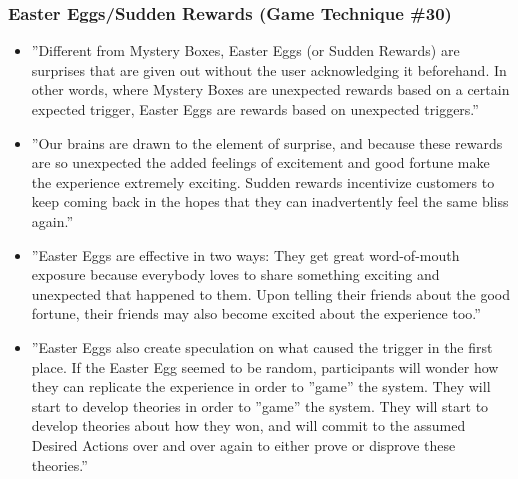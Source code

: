     \subsubsection{Easter Eggs/Sudden Rewards (Game Technique \#30)}
        \begin{itemize}
            \item ''Different from Mystery Boxes, Easter Eggs (or Sudden Rewards) are surprises that are given out without the user acknowledging it beforehand. In other words, where Mystery Boxes are unexpected rewards based on a certain expected trigger, Easter Eggs are rewards based on unexpected triggers.''
            \item ''Our brains are drawn to the element of surprise, and because these rewards are so unexpected the added feelings of excitement and good fortune make the experience extremely exciting. Sudden rewards incentivize customers to keep coming back in the hopes that they can inadvertently feel the same bliss again.''
            \item ''Easter Eggs are effective in two ways: They get great word-of-mouth exposure because everybody loves to share something exciting and unexpected that happened to them. Upon telling their friends about the good fortune, their friends may also become excited about the experience too.''
            \item ''Easter Eggs also create speculation on what caused the trigger in the first place. If the Easter Egg seemed to be random, participants will wonder how they can replicate the experience in order to ''game'' the system. They will start to develop theories in order to ''game'' the system. They will start to develop theories about how they won, and will commit to the assumed Desired Actions over and over again to either prove or disprove these theories.''
        \end{itemize}
        
